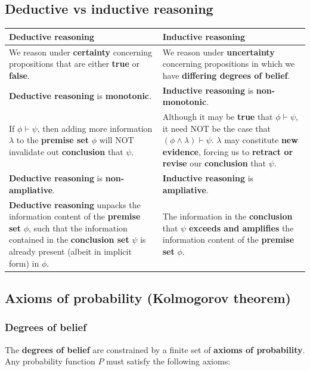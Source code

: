 \documentclass[11pt]{article}
\begin{document}
\subsection{Deductive vs inductive reasoning}
\label{sec:org2bc8381}
\begin{center}
\begin{tabularx}{\textwidth}{|X|X|}
\hline
Deductive reasoning & Inductive reasoning\\
\hline
We reason under \textbf{certainty} concerning propositions that are either \textbf{true} or \textbf{false}. & We reason under \textbf{uncertainty} concerning propositions in which we have \textbf{differing degrees of belief}.\\
\hline
\textbf{Deductive reasoning} is \textbf{monotonic}. & \textbf{Inductive reasoning} is \textbf{non-monotonic}.\\
If \(\phi \vdash \psi\), then adding more information \(\lambda\) to the \textbf{premise set} \(\phi\) will NOT invalidate out \textbf{conclusion} that \(\psi\). & Although it may be \textbf{true} that \(\phi \vdash \psi\), it need NOT be the case that \((\phi \wedge \lambda) \vdash \psi\). \(\lambda\) may constitute \textbf{new evidence}, forcing us to \textbf{retract or revise} our \textbf{conclusion} that \(\psi\).\\
\hline
\textbf{Deductive reasoning} is \textbf{non-ampliative}. & \textbf{Inductive reasoning} is \textbf{ampliative}.\\
\textbf{Deductive reasoning} unpacks the information content of the \textbf{premise set} \(\phi\), such that the information contained in the \textbf{conclusion set} \(\psi\) is already present (albeit in implicit form) in \(\phi\). & The information in the \textbf{conclusion} that \(\psi\) \textbf{exceeds and amplifies} the information content of the \textbf{premise set} \(\phi\).\\
\hline
\end{tabularx}
\end{center}
 \newpage
\subsection{Axioms of probability (Kolmogorov theorem)}
\label{sec:org3a4421f}

\subsubsection{Degrees of belief}
\label{sec:org4ffeb70}
The \textbf{degrees of belief} are constrained by a finite set of \textbf{axioms of probability}. Any probability function \(P\) must satisfy the following axioms:
\end{document}
